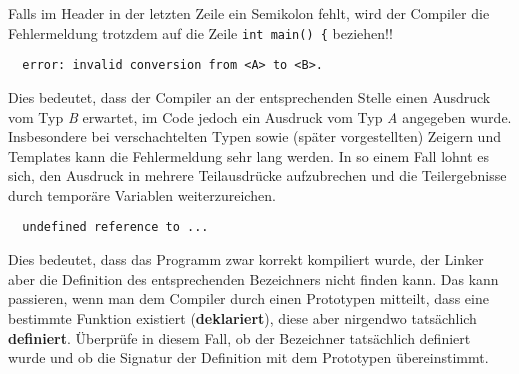 Falls im Header  in der letzten Zeile ein Semikolon fehlt, wird der Compiler die Fehlermeldung trotzdem auf die Zeile \glqq{}\lstinline{int main() {}\grqq{} beziehen!!

\begin{verbatim}
  error: invalid conversion from <A> to <B>.
\end{verbatim}

Dies bedeutet, dass der Compiler an der entsprechenden Stelle einen Ausdruck vom Typ \emph{B} erwartet, im Code jedoch ein Ausdruck vom Typ \emph{A} angegeben wurde. Insbesondere bei verschachtelten Typen sowie (später vorgestellten) Zeigern und Templates kann die Fehlermeldung sehr lang werden. In so einem Fall lohnt es sich, den Ausdruck in mehrere Teilausdrücke aufzubrechen und die Teilergebnisse durch temporäre Variablen weiterzureichen.

\begin{verbatim}
  undefined reference to ...
\end{verbatim}

Dies bedeutet, dass das Programm zwar korrekt kompiliert wurde, der Linker aber die Definition des entsprechenden Bezeichners nicht finden kann.
Das kann passieren, wenn man dem Compiler durch einen Prototypen mitteilt, dass eine bestimmte Funktion existiert (\textbf{deklariert}), diese aber nirgendwo tatsächlich \textbf{definiert}.
Überprüfe in diesem Fall, ob der Bezeichner tatsächlich definiert wurde und ob die Signatur der Definition mit dem Prototypen übereinstimmt.

